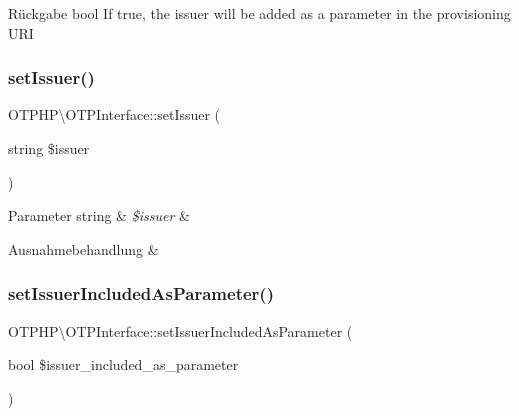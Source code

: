 \begin{DoxyReturn}{Rückgabe}
bool If true, the issuer will be added as a parameter in the provisioning U\+RI 
\end{DoxyReturn}
\mbox{\label{interface_o_t_p_h_p_1_1_o_t_p_interface_a1892d913d0dd0e73ee3235494d47ba4d}} 
\subsubsection{\texorpdfstring{set\+Issuer()}{setIssuer()}}
{\footnotesize\ttfamily O\+T\+P\+H\+P\textbackslash{}\+O\+T\+P\+Interface\+::set\+Issuer (\begin{DoxyParamCaption}\item[{string}]{\$issuer }\end{DoxyParamCaption})}


\begin{DoxyParams}[1]{Parameter}
string & {\em \$issuer} & \\
\hline
\end{DoxyParams}

\begin{DoxyExceptions}{Ausnahmebehandlung}
{\em } & \\
\hline
\end{DoxyExceptions}
\mbox{\label{interface_o_t_p_h_p_1_1_o_t_p_interface_ab88b212c288fd17da38121979f9e50b1}} 
\subsubsection{\texorpdfstring{set\+Issuer\+Included\+As\+Parameter()}{setIssuerIncludedAsParameter()}}
{\footnotesize\ttfamily O\+T\+P\+H\+P\textbackslash{}\+O\+T\+P\+Interface\+::set\+Issuer\+Included\+As\+Parameter (\begin{DoxyParamCaption}\item[{bool}]{\$issuer\+\_\+included\+\_\+as\+\_\+parameter }\end{DoxyParamCaption})}


